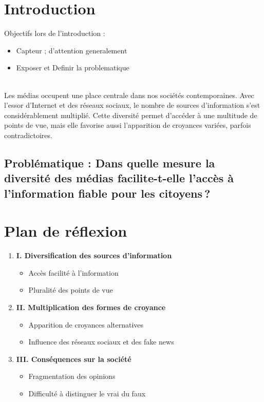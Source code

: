 \documentclass[12pt]{article}
\begin{document}
\section*{Introduction}
Objectifs lors de l'introduction :
\begin{itemize}
    \item Capteur ; d'attention generalement
    \item Exposer et Definir la problematique
\end{itemize}
\\
Les médias occupent une place centrale dans nos sociétés contemporaines. Avec l'essor d'Internet et des réseaux sociaux, le nombre de sources d'information s'est considérablement multiplié. Cette diversité permet d'accéder à une multitude de points de vue, mais elle favorise aussi l'apparition de croyances variées, parfois contradictoires.


\subsection*{\textbf{Problématique :} Dans quelle mesure la diversité des médias facilite-t-elle l’accès à l’information fiable pour les citoyens ?}

\section*{Plan de réflexion}

\begin{enumerate}
    \item \textbf{I. Diversification des sources d'information}
    \begin{itemize}
        \item Accès facilité à l'information
        \item Pluralité des points de vue
    \end{itemize}
    \item \textbf{II. Multiplication des formes de croyance}
    \begin{itemize}
        \item Apparition de croyances alternatives
        \item Influence des réseaux sociaux et des fake news
    \end{itemize}
    \item \textbf{III. Conséquences sur la société}
    \begin{itemize}
        \item Fragmentation des opinions
        \item Difficulté à distinguer le vrai du faux
    \end{itemize}
\end{enumerate}
\end{document}
